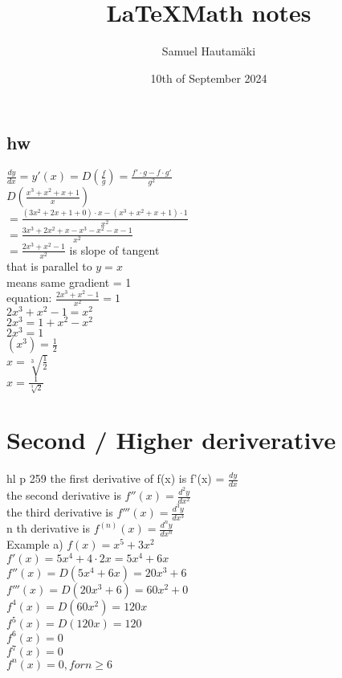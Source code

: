 \documentclass{article}
\title{\LaTeX Math notes}
\author{Samuel Hautamäki}
\date{10th of September 2024}
\begin{document}
  \maketitle
  
  \subsection{hw}
  $\frac{dy}{dx}=y'(x)=D(\frac{f}{g})=\frac{f'\cdot g-f\cdot g'}{g^2}$\\
  $D(\frac{x^3+x^2+x+1}{x})$\\
  $=\frac{(3x^2+2x+1+0)\cdot x-(x^3+x^2+x+1)\cdot 1}{x^2}$\\
  $=\frac{3x^3+2x^2+x-x^3-x^2-x-1}{x^2}$\\
  $=\frac{2x^3+x^2-1}{x^2}$ is slope of tangent\\
  that is parallel to $y=x$\\
  means same gradient = 1\\
  equation: $\frac{2x^3+x^2-1}{x^2}=1$\\
  $2x^3+x^2-1=x^2$\\
  $2x^3=1+x^2-x^2$\\
  $2x^3=1$\\
  $(x^3)=\frac{1}{2}$\\
  $x=\sqrt[3]{\frac{1}{2}}$\\
  $x=\frac{1}{\sqrt[3]{2}}$\\

  \section{Second / Higher deriverative}
  hl p 259
  the first derivative of f(x) is f'(x) = $\frac{dy}{dx}$\\
  the second derivative is $f''(x)=\frac{d^2y}{dx^2}$\\
  the third derivative is $f'''(x)=\frac{d^3y}{dx^3}$\\
  n th derivative is $f^{(n)}(x)=\frac{d^ny}{dx^n}$\\
  Example a) $f(x)=x^5+3x^2$\\
  $f'(x)=5x^4+4\cdot2x=5x^4+6x$\\
  $f''(x)=D(5x^4+6x)=20x^3+6$\\
  $f'''(x)=D(20x^3+6)=60x^2+0$\\
  $f^4(x)=D(60x^2)=120x$\\
  $f^5(x)=D(120x)=120$\\
  $f^6(x)=0$\\
  $f^7(x)=0$\\
  $f^n(x)=0, for n\geq6$\\
  
\end{document}
